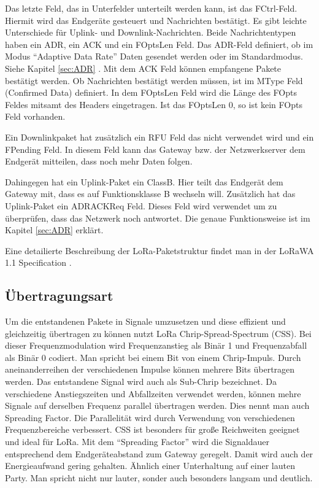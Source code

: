 \documentclass[a4paper, 12pt]{article}
\begin{document}
                Das letzte Feld, das in Unterfelder unterteilt werden kann, ist das FCtrl-Feld. Hiermit wird das Endgeräte 
                gesteuert und Nachrichten bestätigt. Es gibt leichte Unterschiede für Uplink- und Downlink-Nachrichten. 
                Beide Nachrichtentypen haben ein ADR, ein ACK und ein FOptsLen Feld. Das ADR-Feld definiert, 
                ob im Modus ``Adaptive Data Rate'' Daten gesendet werden oder im Standardmodus. Siehe Kapitel \ref{sec:ADR} . 
                Mit dem ACK Feld können empfangene Pakete bestätigt werden. Ob Nachrichten bestätigt werden müssen,
                ist im MType Feld (Confirmed Data) definiert. In dem FOptsLen Feld wird die Länge des FOpts Feldes mitsamt des 
                Headers eingetragen. Ist das FOptsLen 0, so ist kein FOpts Feld vorhanden.

                Ein Downlinkpaket hat zusätzlich ein RFU Feld das nicht verwendet wird und ein FPending Feld. In diesem 
                Feld kann das Gateway bzw. der Netzwerkserver dem Endgerät mitteilen, dass noch mehr Daten folgen.

                Dahingegen hat ein Uplink-Paket ein ClassB. Hier teilt das Endgerät dem Gateway mit, dass es auf 
                Funktionsklasse B wechseln will. Zusätzlich hat das Uplink-Paket ein ADRACKReq Feld. Dieses Feld 
                wird verwendet um zu überprüfen, dass das Netzwerk noch antwortet. 
                Die genaue Funktionsweise ist im Kapitel \ref{sec:ADR}  erklärt.

                Eine detailierte Beschreibung der LoRa-Paketstruktur findet man in der LoRaWA 1.1 Specification \cite{LoRaSpec}.   
                
                
        \subsection{Übertragungsart}\label{sec:Modulation}
            Um die entstandenen Pakete in Signale umzusetzen und diese effizient und gleichzeitig übertragen zu können
            nutzt LoRa Chrip-Spread-Spectrum (CSS). Bei dieser Frequenzmodulation wird Frequenzanstieg als Binär 1 und 
            Frequenzabfall als Binär 0 codiert. Man spricht bei einem Bit von einem Chrip-Impuls. Durch 
            aneinanderreihen der verschiedenen Impulse können mehrere Bits übertragen werden. Das entstandene Signal 
            wird auch als Sub-Chrip bezeichnet. Da verschiedene Anstiegszeiten und Abfallzeiten verwendet werden, können  
            mehre Signale auf derselben Frequenz parallel übertragen werden. Dies nennt man auch Spreading Factor. 
            Die Parallelität wird durch Verwendung von verschiedenen Frequenzbereiche verbessert. 
            CSS ist besonders für große Reichweiten geeignet und ideal für LoRa. 
            Mit dem ``Spreading Factor'' wird die Signaldauer entsprechend dem Endgeräteabstand zum Gateway geregelt.
            Damit wird auch der Energieaufwand gering gehalten. Ähnlich einer Unterhaltung auf einer lauten Party. 
            Man spricht nicht nur lauter, sonder auch besonders langsam und deutlich.\cite{explain}
\end{document}
